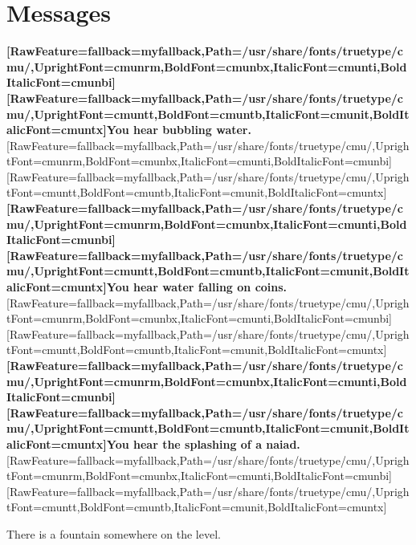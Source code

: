 \section{Messages}
\label{9}
{\bfseries \allowbreak{}\setmainfont{cmunbx.ttf}[RawFeature={fallback=myfallback},Path=/usr/share/fonts/truetype/cmu/,UprightFont=cmunrm,BoldFont=cmunbx,ItalicFont=cmunti,BoldItalicFont=cmunbi]\setmonofont{cmunbx.ttf}[RawFeature={fallback=myfallback},Path=/usr/share/fonts/truetype/cmu/,UprightFont=cmuntt,BoldFont=cmuntb,ItalicFont=cmunit,BoldItalicFont=cmuntx]\bfseries You hear bubbling water.}\allowbreak{}\setmainfont{cmunrm.ttf}[RawFeature={fallback=myfallback},Path=/usr/share/fonts/truetype/cmu/,UprightFont=cmunrm,BoldFont=cmunbx,ItalicFont=cmunti,BoldItalicFont=cmunbi]\setmonofont{cmunrm.ttf}[RawFeature={fallback=myfallback},Path=/usr/share/fonts/truetype/cmu/,UprightFont=cmuntt,BoldFont=cmuntb,ItalicFont=cmunit,BoldItalicFont=cmuntx]
{\bfseries \allowbreak{}\setmainfont{cmunbx.ttf}[RawFeature={fallback=myfallback},Path=/usr/share/fonts/truetype/cmu/,UprightFont=cmunrm,BoldFont=cmunbx,ItalicFont=cmunti,BoldItalicFont=cmunbi]\setmonofont{cmunbx.ttf}[RawFeature={fallback=myfallback},Path=/usr/share/fonts/truetype/cmu/,UprightFont=cmuntt,BoldFont=cmuntb,ItalicFont=cmunit,BoldItalicFont=cmuntx]\bfseries You hear water falling on coins.}\allowbreak{}\setmainfont{cmunrm.ttf}[RawFeature={fallback=myfallback},Path=/usr/share/fonts/truetype/cmu/,UprightFont=cmunrm,BoldFont=cmunbx,ItalicFont=cmunti,BoldItalicFont=cmunbi]\setmonofont{cmunrm.ttf}[RawFeature={fallback=myfallback},Path=/usr/share/fonts/truetype/cmu/,UprightFont=cmuntt,BoldFont=cmuntb,ItalicFont=cmunit,BoldItalicFont=cmuntx]
{\bfseries \allowbreak{}\setmainfont{cmunbx.ttf}[RawFeature={fallback=myfallback},Path=/usr/share/fonts/truetype/cmu/,UprightFont=cmunrm,BoldFont=cmunbx,ItalicFont=cmunti,BoldItalicFont=cmunbi]\setmonofont{cmunbx.ttf}[RawFeature={fallback=myfallback},Path=/usr/share/fonts/truetype/cmu/,UprightFont=cmuntt,BoldFont=cmuntb,ItalicFont=cmunit,BoldItalicFont=cmuntx]\bfseries You hear the splashing of a naiad.}\allowbreak{}\setmainfont{cmunrm.ttf}[RawFeature={fallback=myfallback},Path=/usr/share/fonts/truetype/cmu/,UprightFont=cmunrm,BoldFont=cmunbx,ItalicFont=cmunti,BoldItalicFont=cmunbi]\setmonofont{cmunrm.ttf}[RawFeature={fallback=myfallback},Path=/usr/share/fonts/truetype/cmu/,UprightFont=cmuntt,BoldFont=cmuntb,ItalicFont=cmunit,BoldItalicFont=cmuntx]

\begin{myquote}
\item{}There is a fountain somewhere on the level.
\end{myquote}

